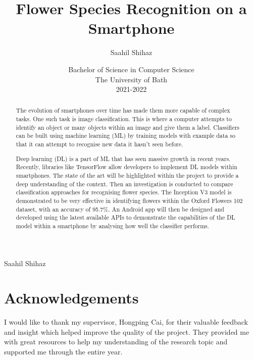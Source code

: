 \documentclass[12pt,a4paper]{report}
\title{\bf Flower Species Recognition on a Smartphone}
\author{Saahil Shihaz}
\date{Bachelor of Science in Computer Science\\
    The University of Bath\\
    2021-2022}
\begin{document}
\hypersetup{pageanchor=false}
\setcounter{page}{0}
\maketitle
\newpage
{}
\newpage
{}
{Saahil Shihaz}
\newpage
\hypersetup{pageanchor=true}
\begin{abstract}

    The evolution of smartphones over time has made them more capable of complex tasks. One such task is image 
    classification. This is where a computer attempts to identify an object or many objects within an image and give 
    them a label. Classifiers can be built using machine learning (ML) by training models with example data so that it 
    can attempt to recognise new data it hasn't seen before. 
    
    \par
    
    Deep learning (DL) is a part of ML that has seen massive 
    growth in recent years. Recently, libraries like TensorFlow allow developers to implement DL models within 
    smartphones. The state of the art will be highlighted within the project to provide a deep understanding of the 
    context. Then an investigation is conducted to compare classification approaches for recognising flower species. The
    Inception V3 model is demonstrated to be very effective in identifying flowers within the Oxford Flowers 102 
    dataset, with an accuracy of 95.7\%. An Android app will then be designed and developed using the latest available 
    APIs to demonstrate the capabilities of the DL model within a smartphone by analysing how well the classifier 
    performs. 

\end{abstract}
\clearpage
\tableofcontents
\clearpage
\listoffigures
\clearpage
\chapter*{Acknowledgements}
\thispagestyle{empty}

I would like to thank my supervisor, Hongping Cai, for their valuable feedback and insight which helped improve the 
quality of the project. They provided me with great resources to help my understanding of the research topic and
supported me through the entire year.

\par
\end{document}
